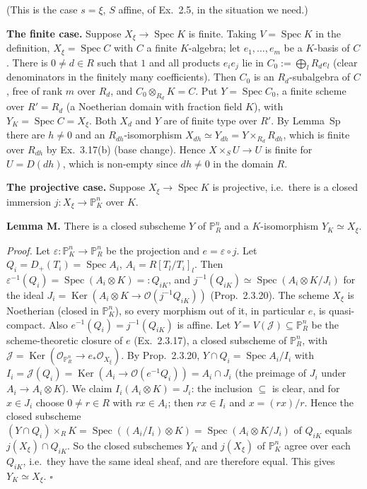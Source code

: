 \documentclass[11pt]{article}
\begin{document}
(This is the case $s=\xi$, $S$ affine, of Ex.~2.5, in the situation we need.)

\textbf{The finite case.} Suppose $X_\xi\to\operatorname{Spec}K$ is finite. Taking $V=\operatorname{Spec}K$ in the definition, $X_\xi=\operatorname{Spec}C$ with $C$ a finite $K$-algebra; let $e_1,\dots,e_m$ be a $K$-basis of $C$. There is $0\neq d\in R$ such that $1$ and all products $e_ie_j$ lie in $C_0:=\bigoplus_lR_de_l$ (clear denominators in the finitely many coefficients). Then $C_0$ is an $R_d$-subalgebra of $C$, free of rank $m$ over $R_d$, and $C_0\otimes_{R_d}K=C$. Put $Y=\operatorname{Spec}C_0$, a finite scheme over $R'=R_d$ (a Noetherian domain with fraction field $K$), with $Y_K=\operatorname{Spec}C=X_\xi$. Both $X_d$ and $Y$ are of finite type over $R'$. By Lemma~Sp there are $h\neq0$ and an $R_{dh}$-isomorphism $X_{dh}\simeq Y_{dh}=Y\times_{R_d}R_{dh}$, which is finite over $R_{dh}$ by Ex.~3.17(b) (base change). Hence $X\times_SU\to U$ is finite for $U=D(dh)$, which is non-empty since $dh\neq0$ in the domain $R$.

\textbf{The projective case.} Suppose $X_\xi\to\operatorname{Spec}K$ is projective, i.e.\ there is a closed immersion $j:X_\xi\to\mathbb{P}^n_K$ over $K$.

\textbf{Lemma M.} There is a closed subscheme $Y$ of $\mathbb{P}^n_R$ and a $K$-isomorphism $Y_K\simeq X_\xi$.

\emph{Proof.} Let $\varepsilon:\mathbb{P}^n_K\to\mathbb{P}^n_R$ be the projection and $e=\varepsilon\circ j$. Let $Q_i=D_+(T_i)=\operatorname{Spec}A_i$, $A_i=R[T_l/T_i]_l$. Then $\varepsilon^{-1}(Q_i)=\operatorname{Spec}(A_i\otimes K)=:Q_{iK}$, and $j^{-1}(Q_{iK})\simeq\operatorname{Spec}(A_i\otimes K/J_i)$ for the ideal $J_i=\operatorname{Ker}(A_i\otimes K\to\mathcal{O}(j^{-1}Q_{iK}))$ (Prop.~2.3.20). The scheme $X_\xi$ is Noetherian (closed in $\mathbb{P}^n_K$), so every morphism out of it, in particular $e$, is quasi-compact. Also $e^{-1}(Q_i)=j^{-1}(Q_{iK})$ is affine. Let $Y=V(\mathcal{J})\subseteq\mathbb{P}^n_R$ be the scheme-theoretic closure of $e$ (Ex.~2.3.17), a closed subscheme of $\mathbb{P}^n_R$, with $\mathcal{J}=\operatorname{Ker}(\mathcal{O}_{\mathbb{P}^n_R}\to e_*\mathcal{O}_{X_\xi})$. By Prop.~2.3.20, $Y\cap Q_i=\operatorname{Spec}A_i/I_i$ with $I_i=\mathcal{J}(Q_i)=\operatorname{Ker}(A_i\to\mathcal{O}(e^{-1}Q_i))=A_i\cap J_i$ (the preimage of $J_i$ under $A_i\to A_i\otimes K$). We claim $I_i(A_i\otimes K)=J_i$: the inclusion $\subseteq$ is clear, and for $x\in J_i$ choose $0\neq r\in R$ with $rx\in A_i$; then $rx\in I_i$ and $x=(rx)/r$. Hence the closed subscheme $(Y\cap Q_i)\times_RK=\operatorname{Spec}((A_i/I_i)\otimes K)=\operatorname{Spec}(A_i\otimes K/J_i)$ of $Q_{iK}$ equals $j(X_\xi)\cap Q_{iK}$. So the closed subschemes $Y_K$ and $j(X_\xi)$ of $\mathbb{P}^n_K$ agree over each $Q_{iK}$, i.e.\ they have the same ideal sheaf, and are therefore equal. This gives $Y_K\simeq X_\xi$. $\square$
\end{document}
